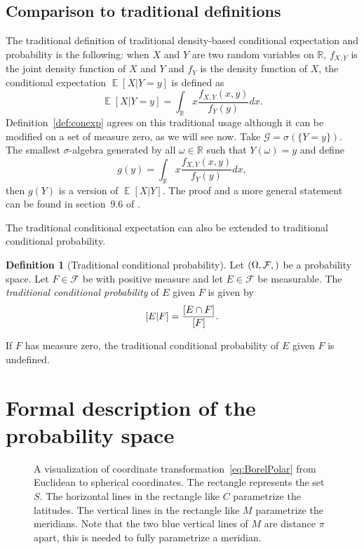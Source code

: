 \documentclass[a4paper]{report}
\theoremstyle{plain}
\theoremstyle{definition}
\newtheorem{definition}[theorem]{Definition}
\theoremstyle{remark}
\numberwithin{equation}{chapter}
\newcommand{\R}{\mathbb{R}}
\let\P\relax
\DeclareMathOperator{\P}{\mathbb{P}}
\DeclareMathOperator{\E}{\mathbb{E}}
\DeclareMathOperator{\1}{\mathbbm{1}}
\newcommand{\F}{\mathcal{F}}
\renewcommand{\G}{\mathcal{G}}
\begin{document}
\subsection{Comparison to traditional definitions}
The traditional definition of traditional density-based conditional expectation and probability is the following: when $X$ and $Y$ are two random variables on $\R$, $f_{X,Y}$ is the joint density function of $X$ and $Y$ and $f_Y$ is the density function of $X$, the conditional expectation $\E[X|Y=y]$ is defined as
\begin{equation}
\E[X|Y=y]=\int_\R x\frac{f_{X,Y}(x,y)}{f_Y(y)}dx.
\end{equation}
Definition~\ref{def:conexp} agrees on this traditional usage although it can be modified on a set of measure zero, as we will see now. Take $\G=\sigma(\{Y=y\})$. The smallest $\sigma$-algebra generated by all $\omega\in\R$ such that $Y(\omega)=y$ and define
\begin{equation}
g(y)=\int_\R x\frac{f_{X,Y}(x,y)}{f_Y(y)}dx,
\end{equation}
then $g(Y)$ is a version of $\E[X|Y]$. The proof and a more general statement can be found in section~9.6 of \cite{Williams91}.

The traditional conditional expectation can also be extended to traditional conditional probability.
\begin{definition}[Traditional conditional probability]
Let $(\Omega,\F, \P)$ be a probability space. Let $F\in\F$ be with positive measure and let $E\in\F$ be measurable. The \emph{traditional conditional probability} of $E$ given $F$ is given by
\begin{equation}
\P[E|F]=\frac{\P[E\cap F]}{\P[F]}.
\end{equation}

If $F$ has measure zero, the traditional conditional probability of $E$ given $F$ is undefined.
\end{definition}

\section{Formal description of the probability space}
\begin{figure}
\centering{

}
\caption{A visualization of coordinate transformation~\eqref{eq:BorelPolar} from Euclidean to spherical coordinates. The rectangle represents the set $S$. The horizontal lines in the rectangle like $C$ parametrize the latitudes. The vertical lines in the rectangle like $M$ parametrize the meridians. Note that the two blue vertical lines of $M$ are distance $\pi$ apart, this is needed to fully parametrize a meridian.}
\label{fig:BorelVis}
\end{figure}
\end{document}
